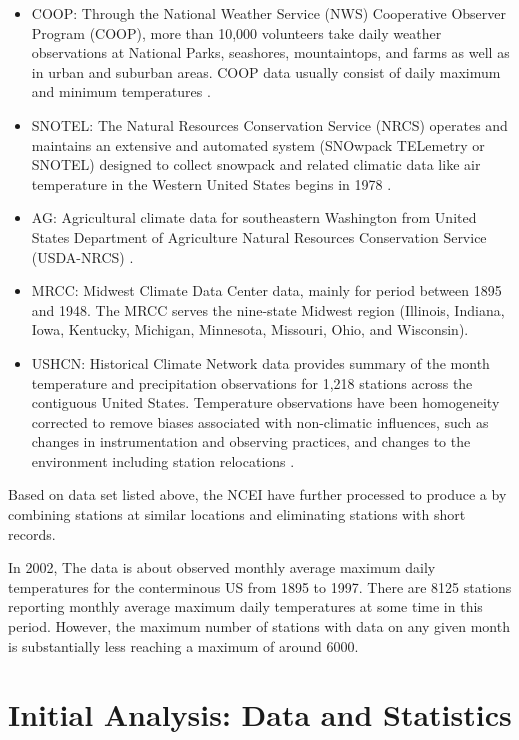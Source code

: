 \begin{itemize}
  \item COOP:
    Through the National Weather Service (NWS) Cooperative Observer Program 
    (COOP), more than 10,000 volunteers take daily weather observations at 
    National Parks, seashores, mountaintops, and farms as well as in urban and 
    suburban areas. COOP data usually consist of daily maximum and minimum 
    temperatures \cite{COOP}.
  \item SNOTEL:
    The Natural Resources Conservation Service (NRCS) operates and maintains an 
    extensive and automated system (SNOwpack TELemetry or SNOTEL) designed to
    collect snowpack and related climatic data like air temperature in the Western
    United States begins in 1978 \cite{SNOTEL}.
  \item AG:
    Agricultural climate data for southeastern Washington from United States
    Department of Agriculture Natural Resources Conservation Service (USDA-NRCS) 
    \cite{USDA}.
  \item MRCC:
    Midwest Climate Data Center data, mainly for period between 1895 and 1948. 
    The MRCC \cite{MRCC} serves the nine-state Midwest region (Illinois, Indiana, 
    Iowa, Kentucky, Michigan, Minnesota, Missouri, Ohio, and Wisconsin).
  \item USHCN:
    Historical Climate Network data provides summary of the month temperature and 
    precipitation observations for 1,218 stations across the contiguous United 
    States. Temperature observations have been homogeneity corrected to remove 
    biases associated with non-climatic influences, such as changes in 
    instrumentation and observing practices, and changes to the environment 
    including station relocations \cite{USHCN}.
\end{itemize}

Based on data set listed above, the NCEI \cite{NCEI} have further processed to 
produce a by combining stations at similar locations and eliminating stations 
with short records.

In 2002,
The data is about observed monthly average maximum daily temperatures for the 
conterminous US from 1895 to 1997.
There are 8125 stations reporting monthly average maximum daily temperatures at 
some time in this period. However, the maximum number of stations 
with data on any given month is substantially less reaching a maximum of around 
6000. 

\section{Initial Analysis: Data and Statistics}

